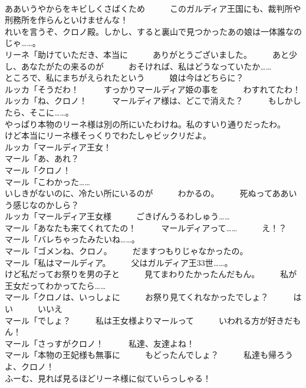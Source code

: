 \documentclass[8pt]{extreport}
\begin{document}
\begin{CJK}{UTF8}{min}
\\	ああいうやからをキビしくさばくため　　　このガルディア王国にも、裁判所や　　　刑務所を作らんといけませんな！	
\\	れいを言うぞ、クロノ殿。しかし、すると裏山で見つかったあの娘は一体誰なのじゃ……。	
\\	リーネ「助けていただき、本当に　　　ありがとうございました。　　　あと少し、あなたがたの来るのが　　　おそければ、私はどうなっていたか……	
\\	ところで、私にまちがえられたという　　　娘は今はどちらに？	
\\	ルッカ「そうだわ！　　　すっかりマールディア姫の事を　　　わすれてたわ！	
\\	ルッカ「ね、クロノ！　　　マールディア様は、どこで消えた？　　　もしかしたら、そこに……。	
\\	やっぱり本物のリーネ様は別の所にいたわけね。私のすいり通りだったわ。	
\\	けど本当にリーネ様そっくりでわたしゃビックリだよ。	
\\	ルッカ「マールディア王女！	
\\	マール「あ、あれ？	
\\	マール「クロノ！	
\\	マール「こわかった……	
\\	いしきがないのに、冷たい所にいるのが　　　わかるの。　　　死ぬってああいう感じなのかしら？	
\\	ルッカ「マールディア王女様　　　ごきげんうるわしゅう……	
\\	マール「あなたも来てくれてたの！　　　マールディアって……　　　え！？	
\\	マール「バレちゃったみたいね……。	
\\	マール「ゴメンね、クロノ。　　　だますつもりじゃなかったの。	
\\	マール「私はマールディア。　　　父はガルディア王33世……。	
\\	けど私だってお祭りを男の子と　　　見てまわりたかったんだもん。　　　私が王女だってわかってたら……	
\\	マール「クロノは、いっしょに　　　お祭り見てくれなかったでしょ？　　　はい　　　いいえ	
\\	マール「でしょ？　　　私は王女様よりマールって　　　いわれる方が好きだもん！	
\\	マール「さっすがクロノ！　　　私達、友達よね！	
\\	マール「本物の王妃様も無事に　　　もどったんでしょ？　　　私達も帰ろうよ、クロノ！	
\\	ふーむ、見れば見るほどリーネ様に似ていらっしゃる！	

\end{CJK}
\end{document}
